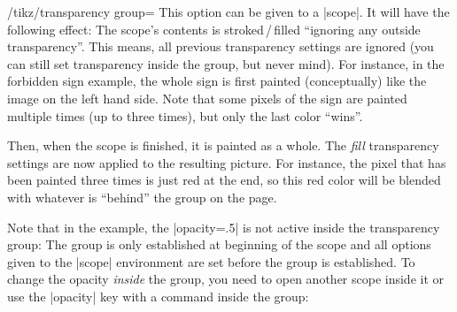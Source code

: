 \begin{key}{/tikz/transparency group=}
    This option can be given to a |scope|. It will have the following effect:
    The scope's contents is stroked\,/\,filled ``ignoring any outside
    transparency''. This means, all previous transparency settings are ignored
    (you can still set transparency inside the group, but never mind). For
    instance, in the forbidden sign example, the whole sign is first painted
    (conceptually) like the image on the left hand side. Note that some pixels
    of the sign are painted multiple times (up to three times), but only the
    last color ``wins''.

    Then, when the scope is finished, it is painted as a whole. The \emph{fill}
    transparency settings are now applied to the resulting picture. For
    instance, the pixel that has been painted three times is just red at the
    end, so this red color will be blended with whatever is ``behind'' the
    group on the page.
\begin{codeexample}[]
\end{codeexample}

    Note that in the example, the |opacity=.5| is not active inside the
    transparency group: The group is only established at beginning of the scope
    and all options given to the |{scope}| environment are set before the group
    is established. To change the opacity \emph{inside} the group, you need to
    open another scope inside it or use the |opacity| key with a command inside
    the group:
\begin{codeexample}[]
\end{codeexample}
\end{key}
